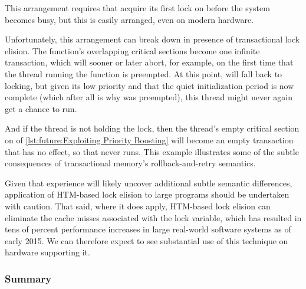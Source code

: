 \begin{fcvref}
This arrangement requires that  acquire its first
lock on  before the system becomes busy, but this is easily
arranged, even on modern hardware.

Unfortunately, this arrangement can break down in presence of transactional
lock elision.
The  function's overlapping critical sections become
one infinite transaction, which will sooner or later abort,
for example, on the first time that the thread running
the  function is preempted.
At this point,  will fall back to locking, but given
its low priority and that the quiet initialization period is now
complete (which after all is why  was preempted),
this thread might never again get a chance to run.

And if the  thread is not holding the lock, then
the  thread's empty critical section on  of
\cref{lst:future:Exploiting Priority Boosting}
will become an empty transaction that has no effect, so that
 never runs.
This example illustrates some of the subtle consequences of
transactional memory's rollback-and-retry semantics.
\end{fcvref}

Given that experience will likely uncover additional subtle semantic
differences, application of HTM-based lock elision to large programs
should be undertaken with caution.
That said, where it does apply, HTM-based lock elision can eliminate
the cache misses associated with the lock variable, which has resulted
in tens of percent performance increases in large real-world software
systems as of early 2015.
We can therefore expect to see substantial use of this technique on
hardware supporting it.

\QuickQuizEnd

\subsubsection{Summary}
\label{sec:future:HTM Weaknesses WRT Locking: Summary}

